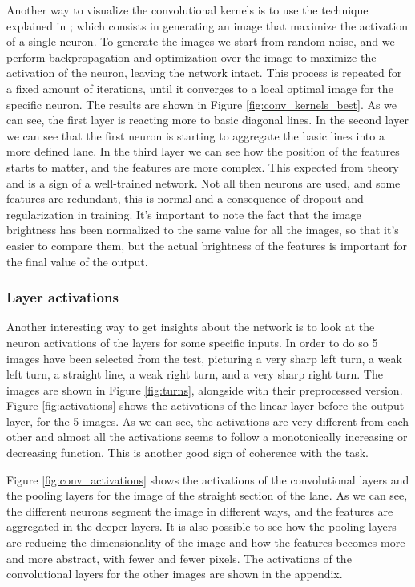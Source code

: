 \documentclass[a4paper,12pt,sort&compress]{article}
\begin{document}
    Another way to visualize the convolutional kernels is to use the technique explained in
    \citep*{uozbulak_pytorch_vis_2022}; which consists in generating an image that maximize the
    activation of a single neuron. To generate the images we start from random noise, and we perform
    backpropagation and optimization over the image to maximize the activation of the neuron,
    leaving the network intact. This process is repeated for a fixed amount of iterations, until it
    converges to a local optimal image for the specific neuron. The
    results are shown in Figure \ref{fig:conv_kernels_best}. As we can see, the first layer is
    reacting more to basic diagonal lines. In the second layer we can see that the first neuron is
    starting to aggregate the basic lines into a more defined lane. In the third layer we can see
    how the position of the features starts to matter, and the features are more complex. This
    expected from theory and is a sign of a well-trained network. Not all then neurons are used, and
    some features are redundant, this is normal and a consequence of dropout and regularization in training.
    It's important to note the
    fact that the image brightness has been normalized to the same value for all the images, so that
    it's easier to compare them, but the actual brightness of the features is important for the
    final value of the output. 

\subsubsection*{Layer activations}
    Another interesting way to get insights about the network is to look at the neuron activations of the
    layers for some specific inputs. In order to do so 5 images have been selected from the test,
    picturing a very sharp left turn, a weak left turn, a straight line, a weak right turn, and a
    very sharp right turn. The images are shown in Figure \ref{fig:turns}, alongside with their
    preprocessed version. Figure \ref{fig:activations} shows the activations of the linear layer
    before the output layer, for the 5 images. As we can see, the activations are very different
    from each other and almost all the activations seems to follow a monotonically increasing or
    decreasing function. This is another good sign of coherence with the task.

    Figure \ref{fig:conv_activations} shows the activations of the convolutional layers and the
    pooling layers for the image of the straight section of the lane. As we can see, the different
    neurons segment the image in different ways, and the features are aggregated in the deeper
    layers. It is also possible to see how the pooling layers are reducing the dimensionality of the
    image and how the features becomes more and more abstract, with fewer and fewer pixels. The
    activations of the convolutional layers for the other images are shown in the appendix.
 
\end{document}
